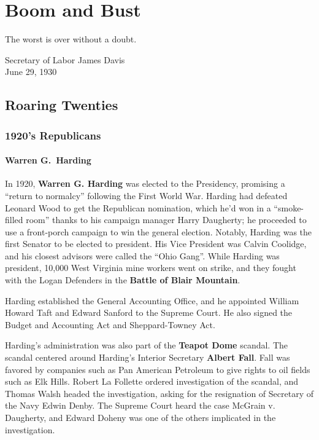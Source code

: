 \chapter{Boom and Bust}

\epigraph{%
  The worst is over without a doubt.
}{Secretary of Labor James Davis \\ June 29, 1930}

\section{Roaring Twenties}

\subsection*{1920's Republicans}

\subsubsection*{Warren G.\ Harding}

In 1920, \textbf{Warren G. Harding} was elected to the Presidency,
promising a ``return to normalcy'' following the First World War.
Harding had defeated Leonard Wood to get the Republican nomination,
which he'd won in a ``smoke-filled room'' thanks to his campaign manager Harry Daugherty;
he proceeded to use a front-porch campaign to win the general election.
Notably, Harding was the first Senator to be elected to president.
His Vice President was Calvin Coolidge, and his closest advisors were called the ``Ohio Gang''.
While Harding was president, 10,000 West Virginia mine workers went on strike,
and they fought with the Logan Defenders in the \textbf{Battle of Blair Mountain}.

Harding established the General Accounting Office,
and he appointed William Howard Taft and Edward Sanford to the Supreme Court.
He also signed the Budget and Accounting Act and Sheppard-Towney Act.

Harding's administration was also part of the \textbf{Teapot Dome} scandal.
The scandal centered around Harding's Interior Secretary \textbf{Albert Fall}.
Fall was favored by companies such as Pan American Petroleum to give rights to oil fields such as Elk Hills.
Robert La Follette ordered investigation of the scandal,
and Thomas Walsh headed the investigation, asking for the resignation of Secretary of the Navy Edwin Denby.
The Supreme Court heard the case McGrain v. Daugherty,
and Edward Doheny was one of the others implicated in the investigation.

